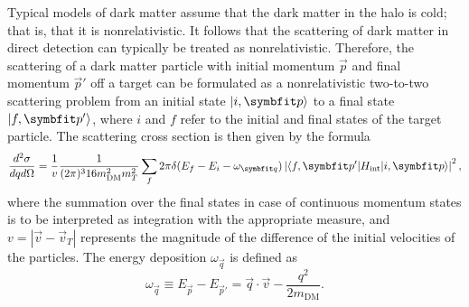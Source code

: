 Typical models of dark matter assume that the dark matter in the halo is cold; that is, that it is nonrelativistic. It follows that the scattering of dark matter in direct detection can typically be treated as nonrelativistic. Therefore, the scattering of a dark matter particle with initial momentum $\vec{p}$ and final momentum $\vec{p}'$ off a target can be formulated as a nonrelativistic two-to-two scattering problem from an initial state $\ket{i,\vec{p}}$ to a final state $\ket{f,\vec{p}'}$, where $i$ and $f$ refer to the initial and final states of the target particle. The scattering cross section is then given by the formula
\begin{equation}
    \ddder{\sigma}{q}{\Omega}=\frac{1}{v}\frac{1}{(2\pi)^3 16m_\text{DM}^2m_T^2}\sum_f2\pi\delta(E_f-E_i-\omega_{\vec{q}})\left|\brakett{f,\vec{p}'}{H_\text{int}}{i,\vec{p}}\right|^2,
\end{equation}
where the summation over the final states in case of continuous momentum states is to be interpreted as integration with the appropriate measure, and $v=|\vec{v}-\vec{v}_T|$ represents the magnitude of the difference of the initial velocities of the particles. The energy deposition $\omega_{\vec{q}}$ is defined as
\begin{equation}
    \omega_{\vec{q}}\equiv E_{\vec{p}}-E_{\vec{p}'}=\vec{q}\cdot\vec{v}-\frac{q^2}{2m_\text{DM}}.
\end{equation}

